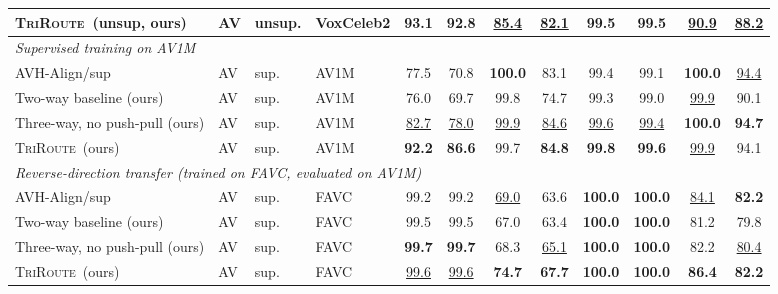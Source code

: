 \documentclass{article}
\newcommand{\method}{\textsc{TriRoute}}
\begin{document}
\begin{table}[t]
{\begin{tabular}{llllcccccccc}
        \method\ (unsup, ours)                  & AV & unsup. & VoxCeleb2 & 93.1 & 92.8 & \underline{85.4} & \underline{82.1} & 99.5 & 99.5 & \underline{90.9} & \underline{88.2} \\
        \midrule
        \multicolumn{12}{l}{\emph{Supervised training on AV1M}} \\
        AVH-Align/sup \citep{smeu2025avhalign} & AV & sup. & AV1M & 77.5 & 70.8 & \textbf{100.0} & 83.1 & 99.4 & 99.1 & \textbf{100.0} & \underline{94.4} \\
        Two-way baseline (ours)          & AV & sup. & AV1M & 76.0 & 69.7 & 99.8 & 74.7 & 99.3 & 99.0 & \underline{99.9} & 90.1 \\
        Three-way, no push-pull (ours)   & AV & sup. & AV1M & \underline{82.7} & \underline{78.0} & \underline{99.9} & \underline{84.6} & \underline{99.6} & \underline{99.4} & \textbf{100.0} & \textbf{94.7} \\
        \method\ (ours)                  & AV & sup. & AV1M & \textbf{92.2} & \textbf{86.6} & 99.7 & \textbf{84.8} & \textbf{99.8} & \textbf{99.6} & \underline{99.9} & 94.1 \\
        \midrule
        \multicolumn{12}{l}{\emph{Reverse-direction transfer (trained on FAVC, evaluated on AV1M)}} \\
        AVH-Align/sup \citep{smeu2025avhalign} & AV & sup. & FAVC & 99.2 & 99.2 & \underline{69.0} & 63.6 & \textbf{100.0} & \textbf{100.0} & \underline{84.1} & \textbf{82.2} \\
        Two-way baseline (ours)          & AV & sup. & FAVC & 99.5 & 99.5 & 67.0 & 63.4 & \textbf{100.0} & \textbf{100.0} & 81.2 & 79.8 \\
        Three-way, no push-pull (ours)   & AV & sup. & FAVC & \textbf{99.7} & \textbf{99.7} & 68.3 & \underline{65.1} & \textbf{100.0} & \textbf{100.0} & 82.2 & \underline{80.4} \\
        \method\ (ours)                  & AV & sup. & FAVC & \underline{99.6} & \underline{99.6} & \textbf{74.7} & \textbf{67.7} & \textbf{100.0} & \textbf{100.0} & \textbf{86.4} & \textbf{82.2} \\
        \bottomrule
    \end{tabular}}
\end{table}
\end{document}

